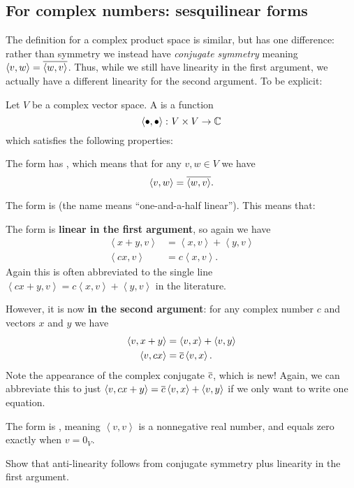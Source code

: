 \subsection{For complex numbers: sesquilinear forms}
The definition for a complex product space is similar, but has one difference:
rather than symmetry we instead have \emph{conjugate symmetry}
meaning $\left< v, w \right> = \overline{ \left< w,v \right> }$.
Thus, while we still have linearity in the first argument,
we actually have a different linearity for the second argument.
To be explicit:
\begin{definition}
	Let $V$ be a complex vector space.
	A  is a function
	\[ \left< \bullet, \bullet \right> \colon V \times V \to \mathbb C \]
	which satisfies the following properties:
	\begin{itemize}
		\ii The form has , which means that
		for any $v,w \in V$ we have
		\[ \left< v,w \right> = \overline{\left< w,v\right>}. \]

		\ii The form is 
		(the name means ``one-and-a-half linear'').
		This means that:
		\begin{itemize}
		\ii The form is \textbf{linear in the first argument}, so again we have
		\begin{align*}
			\left< x+y, v \right> &= \left< x,v \right> + \left< y,v \right> \\
			\left< cx, v \right> &= c\left< x,v \right>.
		\end{align*}
		Again this is often abbreviated to the single line
		$\left< cx+y, v \right> = c \left< x,v \right> + \left< y,v \right>$
		in the literature.

		\ii However, it is now \textbf{
		in the second argument}:
		for any complex number $c$ and vectors $x$ and $y$ we have
		\begin{align*}
			\left< v, x+y\right> &= \left< v, x\right> + \left< v,y \right> \\
			\left< v, cx \right> &= \overline c \left< v, x\right>.
		\end{align*}
		Note the appearance of the complex conjugate $\overline c$,
		which is new!
		Again, we can abbreviate this to just
		$\left< v, cx+y \right> = \overline c \left< v,x \right> + \left< v,y\right>$
		if we only want to write one equation.
		\end{itemize}

		\ii The form is ,
		meaning $\left<v,v\right>$ is a nonnegative real number,
		and equals zero exactly when $v = 0_V$.
	\end{itemize}
\end{definition}
\begin{exercise}
	Show that anti-linearity follows
	from conjugate symmetry plus linearity in the first argument.
\end{exercise}

